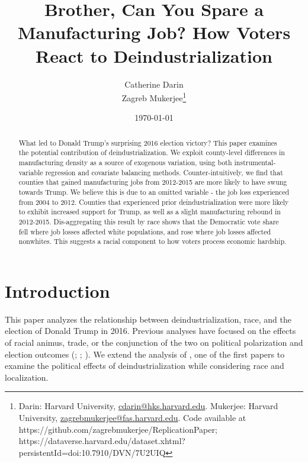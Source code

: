 \documentclass[]{AEA}
\begin{document}
\title{Brother, Can You Spare a Manufacturing Job? How Voters React to
Deindustrialization}


\author{
  Catherine Darin\\
  Zagreb Mukerjee\thanks{
  Darin: Harvard University, \href{mailto:cdarin@hks.harvard.edu}{cdarin@hks.harvard.edu}.
  Mukerjee: Harvard University, \href{mailto:zagrebmukerjee@fas.harvard.edu}{zagrebmukerjee@fas.harvard.edu}.
  Code available at https://github.com/zagrebmukerjee/ReplicationPaper;
  https://dataverse.harvard.edu/dataset.xhtml?persistentId=doi:10.7910/DVN/7U2UIQ
}
}

\date{\today}
\pubVolume{}
\pubIssue{}
\JEL{}
\Keywords{}

\begin{abstract}
What led to Donald Trump's surprising 2016 election victory? This paper
examines the potential contribution of deindustrialization. We exploit
county-level differences in manufacturing density as a source of
exogenous variation, using both instrumental-variable regression and
covariate balancing methods. Counter-intuitively, we find that counties
that gained manufacturing jobs from 2012-2015 are more likely to have
swung towards Trump. We believe this is due to an omitted variable - the
job loss experienced from 2004 to 2012. Counties that experienced prior
deindustrialization were more likely to exhibit increased support for
Trump, as well as a slight manufacturing rebound in 2012-2015.
Dis-aggregating this result by race shows that the Democratic vote share
fell where job losses affected white populations, and rose where job
losses affected nonwhites. This suggests a racial component to how
voters process economic hardship.
\end{abstract}


\maketitle

\section{Introduction} 
\label{Introduction}

This paper analyzes the relationship between deindustrialization, race,
and the election of Donald Trump in 2016. Previous analyses have focused
on the effects of racial animus, trade, or the conjunction of the two on
political polarization and election outcomes (\cite{Autor20};
\cite{Che16}; \cite{BR21}). We extend the analysis of \cite{Baccini21},
one of the first papers to examine the political effects of
deindustrialization while considering race and localization.
\end{document}
